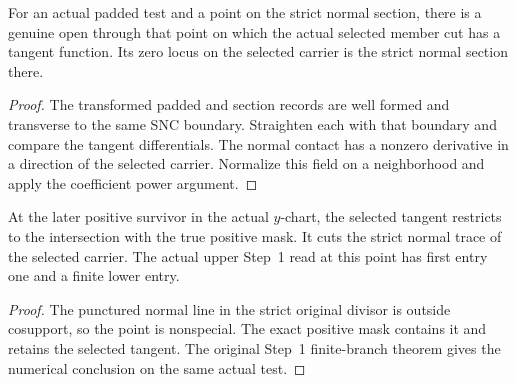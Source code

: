 \begin{theorem}
\label{hir:g1-later-positive-contact-exists}
\leanok
For an actual padded test and a point on the strict normal section,
there is a genuine open through that point on which the actual
selected member cut has a tangent function. Its zero locus on
the selected carrier is the strict normal section there.
\end{theorem}
\begin{proof}
The transformed padded and section records are well formed and
transverse to the same SNC boundary. Straighten each with that
boundary and compare the tangent differentials. The normal
contact has a nonzero derivative in a direction of the selected
carrier. Normalize this field on a neighborhood and apply the
coefficient power argument.
\end{proof}

\begin{theorem}
\label{hir:g1-joint-example-later-selected-finite}
\leanok
At the later positive survivor in the actual $y$-chart,
the selected tangent restricts to the intersection with the true
positive mask. It cuts the strict normal trace of the selected
carrier. The actual upper Step~1 read at this point has first
entry one and a finite lower entry.
\end{theorem}
\begin{proof}
The punctured normal line in the strict original divisor is
outside cosupport, so the point is nonspecial. The exact
positive mask contains it and retains the selected tangent.
The original Step~1 finite-branch theorem gives the numerical
conclusion on the same actual test.
\end{proof}


